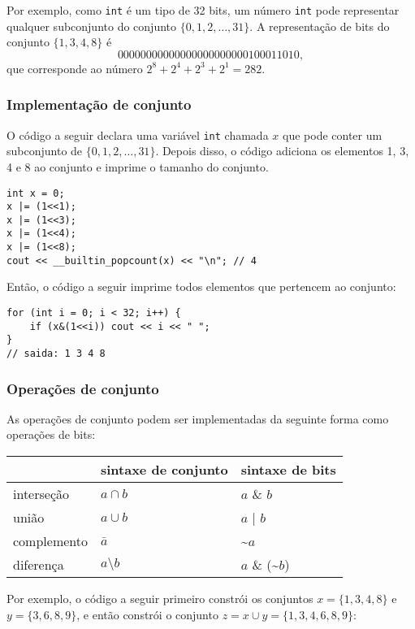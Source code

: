 Por exemplo, como \texttt{int} é um tipo de 32 bits,
um número \texttt{int} pode representar qualquer subconjunto
do conjunto $\{0,1,2,\ldots,31\}$.
A representação de bits do conjunto $\{1,3,4,8\}$ é
\[00000000000000000000000100011010,\]
que corresponde ao número $2^8+2^4+2^3+2^1=282$.

\subsubsection{Implementação de conjunto}

O código a seguir declara uma variável \texttt{int}
chamada $x$ que pode conter
um subconjunto de $\{0,1,2,\ldots,31\}$.
Depois disso, o código adiciona os elementos 1, 3, 4 e 8
ao conjunto e imprime o tamanho do conjunto.
\begin{lstlisting}
int x = 0;
x |= (1<<1);
x |= (1<<3);
x |= (1<<4);
x |= (1<<8);
cout << __builtin_popcount(x) << "\n"; // 4
\end{lstlisting}
Então, o código a seguir imprime todos
elementos que pertencem ao conjunto:
\begin{lstlisting}
for (int i = 0; i < 32; i++) {
    if (x&(1<<i)) cout << i << " ";
}
// saida: 1 3 4 8
\end{lstlisting}

\subsubsection{Operações de conjunto}

As operações de conjunto podem ser implementadas da seguinte forma como operações de bits:

\begin{center}
\begin{tabular}{lll}
& sintaxe de conjunto & sintaxe de bits \\
\hline
interseção & $a \cap b$ & $a$ \& $b$ \\
união & $a \cup b$ & $a$ | $b$ \\
complemento & $\bar a$ & \textasciitilde$a$ \\
diferença & $a \setminus b$ & $a$ \& (\textasciitilde$b$) \\
\end{tabular}
\end{center}

Por exemplo, o código a seguir primeiro constrói
os conjuntos $x=\{1,3,4,8\}$ e $y=\{3,6,8,9\}$,
e então constrói o conjunto $z = x \cup y = \{1,3,4,6,8,9\}$:

